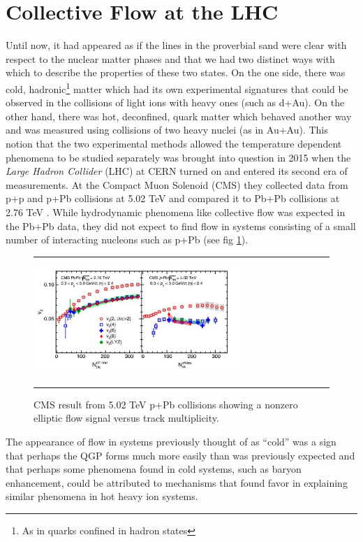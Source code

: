 \section{Collective Flow at the LHC}
Until now, it had appeared as if the lines in the proverbial sand were clear with respect to the nuclear matter phases and that we had two distinct ways with which to describe the properties of these two states. On the one side, there was cold, hadronic\footnote{As in quarks confined in hadron states} matter which had its own experimental signatures that could be observed in the collisions of light ions with heavy ones (such as d+Au). On the other hand, there was hot, deconfined, quark matter which behaved another way and was measured using collisions of two heavy nuclei (as in Au+Au). This notion that the two experimental methods allowed the temperature dependent phenomena to be studied separately was brought into question in 2015 when the \textit{Large Hadron Collider} (LHC) at CERN turned on and entered its second era of measurements. At the Compact Muon Solenoid (CMS) they collected data from p+p and p+Pb collisions at 5.02 TeV and compared it to Pb+Pb collisions at 2.76 TeV \citep{Khachatryan:2015waa}. While hydrodynamic phenomena like collective flow was expected in the Pb+Pb data, they did not expect to find flow in systems consisting of a small number of interacting nucleons such as p+Pb (see fig \ref{fig:pPbflow}).
 
\begin{figure}[htbp!]
  \centering    \rule{35em}{0.5pt}
    \includegraphics[width=0.7\textwidth]{prevplots/pPbflowLHC.JPG}

  \caption[Elliptic Flow in p+Pb at the LHC]{CMS result from 5.02 TeV p+Pb collisions showing a nonzero elliptic flow signal versus track multiplicity. \citep{Khachatryan:2015waa}}
  \label{fig:pPbflow}    \rule{35em}{0.5pt}
\end{figure} 

The appearance of flow in systems previously thought of as ``cold'' was a sign that perhaps the QGP forms much more easily than was previously expected and that perhaps some phenomena found in cold systems, such as baryon enhancement, could be attributed to mechanisms that found favor in explaining similar phenomena in hot heavy ion systems.

